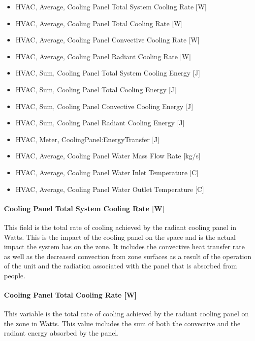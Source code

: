 \begin{itemize}
\item
  HVAC, Average, Cooling Panel Total System Cooling Rate [W]
\item
  HVAC, Average, Cooling Panel Total Cooling Rate [W]
\item
  HVAC, Average, Cooling Panel Convective Cooling Rate [W]
\item
  HVAC, Average, Cooling Panel Radiant Cooling Rate [W]
\item
  HVAC, Sum, Cooling Panel Total System Cooling Energy [J]
\item
  HVAC, Sum, Cooling Panel Total Cooling Energy [J]
\item
  HVAC, Sum, Cooling Panel Convective Cooling Energy [J]
\item
  HVAC, Sum, Cooling Panel Radiant Cooling Energy [J]
\item
  HVAC, Meter, CoolingPanel:EnergyTransfer [J]
\item
  HVAC, Average, Cooling Panel Water Mass Flow Rate [kg/s]
\item
  HVAC, Average, Cooling Panel Water Inlet Temperature [C]
\item
  HVAC, Average, Cooling Panel Water Outlet Temperature [C]
\end{itemize}

\paragraph{Cooling Panel Total System Cooling Rate [W]}\label{cooling-panel-total-system-cooling-rate-w}

This field is the total rate of cooling achieved by the radiant cooling panel in Watts. This is the impact of the cooling panel on the space and is the actual impact the system has on the zone.  It includes the convective heat transfer rate as well as the decreased convection from zone surfaces as a result of the operation of the unit and the radiation associated with the panel that is absorbed from people.

\paragraph{Cooling Panel Total Cooling Rate [W]}\label{cooling-panel-total-cooling-rate-w}

This variable is the total rate of cooling achieved by the radiant cooling panel on the zone in Watts. This value includes the sum of both the convective and the radiant energy absorbed by the panel.

